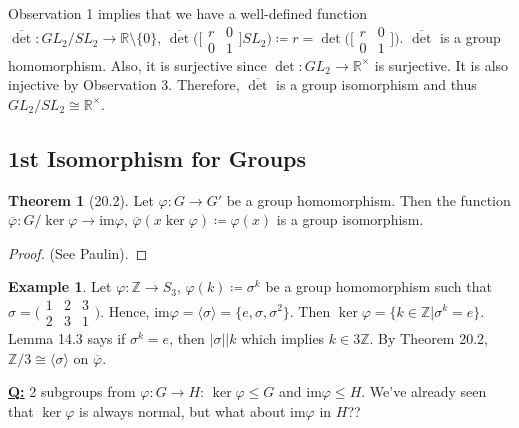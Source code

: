 \documentclass{article}
\newcommand{\Z}{\mathbb{Z}}
\newcommand{\R}{\mathbb{R}}
\newcommand{\coleq}{\coloneqq}
\newcommand{\define}[1]{\textbf{\underline{#1}}}
\newcommand{\func}[3]{#1: #2 \to #3}
\theoremstyle{definition}
\newtheorem*{thm}{Theorem}
\newtheorem*{ex}{Example}
\theoremstyle{remark}
\newcommand{\Rx}{\mathbb{R}^\times}
\newcommand{\cyc}[1]{\langle#1\rangle}
\newcommand{\im}[1]{\mathrm{im}#1}
\begin{document}
{{            \noindent Observation 1 implies that we have a well-defined function $\func{\overline{\det}}{GL_2/SL_2}{\R\setminus\{0\}}, \, \overline{\det}\Big(\big[\begin{smallmatrix} r & 0\\ 0 & 1 \end{smallmatrix}\big]SL_2\Big)\coleq r=\det\Big(\big[\begin{smallmatrix} r & 0\\ 0 & 1 \end{smallmatrix}\big]\Big)$. ${\overline{\det}}$ is a group homomorphism. Also, it is surjective since $\func{\det}{GL_2}{\Rx}$ is surjective. It is also injective by Observation 3. Therefore, $\overline{\det}$ is a group isomorphism and thus $GL_2/SL_2 \cong \Rx$.
        }
        \subsection*{1st Isomorphism for Groups}{
            \begin{thm}[20.2]
                Let $\func{\varphi}{G}{G'}$ be a group homomorphism. Then the function $\func{\overline{\varphi}}{G/\ker\varphi}{\im\varphi}, \, \overline{\varphi}(x\ker\varphi)\coleq \varphi(x)$ is a group isomorphism.
            \end{thm}
            
            \begin{proof}
                (See Paulin).
            \end{proof}
            
            \begin{ex}
                Let $\func{\varphi}{\Z}{S_3}, \, \varphi(k)\coleq \sigma^k$ be a group homomorphism such that $\sigma=\big(\begin{smallmatrix} 1 & 2 & 3\\ 2 & 3 & 1 \end{smallmatrix}\big)$. Hence, $\im \varphi=\cyc{\sigma}=\{e,\sigma,\sigma^2\}$. Then $\ker\varphi=\{k \in \Z|\sigma^k=e\}$. Lemma 14.3 says if $\sigma^k=e$, then $|\sigma|\big|k$ which implies $k\in 3\Z$. By Theorem 20.2, $\Z/3 \cong \cyc{\sigma}$ on $\overline{\varphi}$. 
            \end{ex}
        }
        
        \noindent\define{Q:} 2 subgroups from $\varphi: G \to H$: $\ker\varphi\leq G$ and $\im\varphi\leq H$. We've already seen that $\ker\varphi$ is always normal, but what about $\im \varphi$ in $H$??
    }
\end{document}
